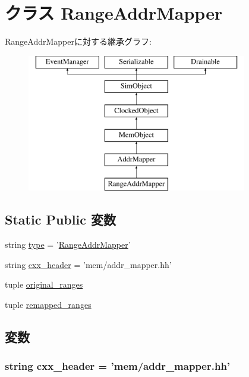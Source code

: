\hypertarget{classAddrMapper_1_1RangeAddrMapper}{
\section{クラス RangeAddrMapper}
\label{classAddrMapper_1_1RangeAddrMapper}
}
RangeAddrMapperに対する継承グラフ:\begin{figure}[H]
\begin{center}
\leavevmode
\includegraphics[height=6cm]{classAddrMapper_1_1RangeAddrMapper}
\end{center}
\end{figure}
\subsection*{Static Public 変数}
\begin{DoxyCompactItemize}
\item 
string \hyperlink{classAddrMapper_1_1RangeAddrMapper_acce15679d830831b0bbe8ebc2a60b2ca}{type} = '\hyperlink{classAddrMapper_1_1RangeAddrMapper}{RangeAddrMapper}'
\item 
string \hyperlink{classAddrMapper_1_1RangeAddrMapper_a17da7064bc5c518791f0c891eff05fda}{cxx\_\-header} = 'mem/addr\_\-mapper.hh'
\item 
tuple \hyperlink{classAddrMapper_1_1RangeAddrMapper_a41478a5c05152cdacb3c68ed86c79473}{original\_\-ranges}
\item 
tuple \hyperlink{classAddrMapper_1_1RangeAddrMapper_a70414aad46e0a883b83c336aa5ee6363}{remapped\_\-ranges}
\end{DoxyCompactItemize}


\subsection{変数}
\hypertarget{classAddrMapper_1_1RangeAddrMapper_a17da7064bc5c518791f0c891eff05fda}{
\subsubsection[{cxx\_\-header}]{\setlength{\rightskip}{0pt plus 5cm}string {\bf cxx\_\-header} = 'mem/addr\_\-mapper.hh'}}
\label{classAddrMapper_1_1RangeAddrMapper_a17da7064bc5c518791f0c891eff05fda}


